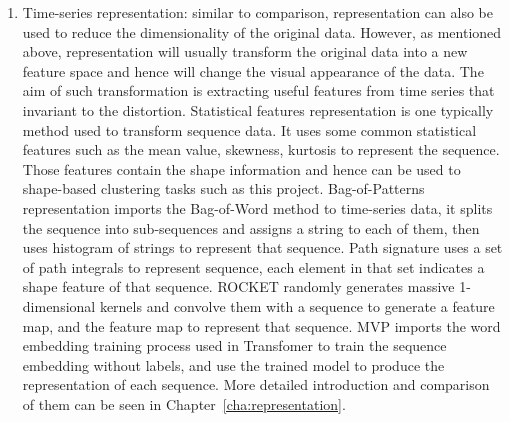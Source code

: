\begin{enumerate}
    \item Time-series representation: similar to comparison, representation can also be used to reduce the dimensionality of the original data. However, as mentioned above, representation will usually transform the original data into a new feature space and hence will change the visual appearance of the data. The aim of such transformation is extracting useful features from time series that invariant to the distortion. Statistical features representation \cite{nanopoulos2001feature} is one typically method used to transform sequence data. It uses some common statistical features such as the mean value, skewness, kurtosis to represent the sequence. Those features contain the shape information and hence can be used to shape-based clustering tasks such as this project. Bag-of-Patterns representation \cite{lin2012rotation} imports the Bag-of-Word method to time-series data, it splits the sequence into sub-sequences and assigns a string to each of them, then uses histogram of strings to represent that sequence. Path signature \cite{chen1958integration} uses a set of path integrals to represent sequence, each element in that set indicates a shape feature of that sequence. ROCKET \cite{dempster2020rocket} randomly generates massive 1-dimensional kernels and convolve them with a sequence to generate a feature map, and the feature map to represent that sequence. MVP \cite{zerveas2020transformer} imports the word embedding training process used in Transfomer to train the sequence embedding without labels, and use the trained model to produce the representation of each sequence. More detailed introduction and comparison of them can be seen in Chapter~\ref{cha:representation}.
\end{enumerate} 

